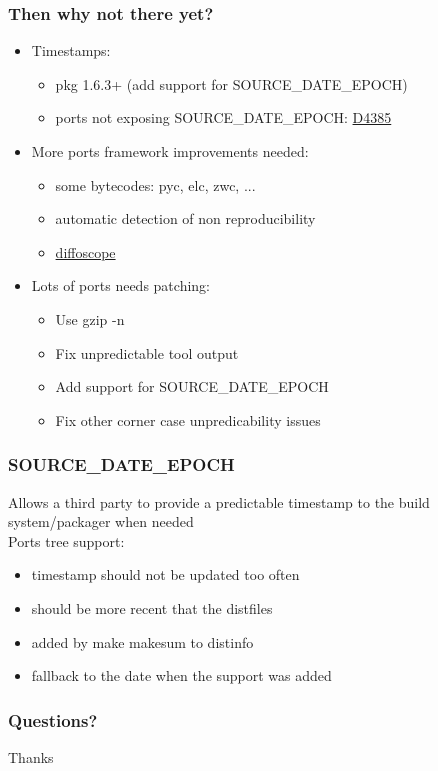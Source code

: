 \begin{frame}
	\frametitle{Then why not there yet?}
	\begin{itemize}
		\pause
		\item Timestamps:
			\begin{itemize}
				\item pkg 1.6.3+ (add support for SOURCE\_DATE\_EPOCH)
				\item ports not exposing SOURCE\_DATE\_EPOCH: \href{https://reviews.freebsd.org/D4385}{D4385}
			\end{itemize}
		\pause
		\item More ports framework improvements needed:
			\begin{itemize}
				\item some bytecodes: pyc, elc, zwc, ...
				\item automatic detection of non reproducibility
				\item \href{https://diffoscope.org/}{diffoscope}
			\end{itemize}
		\pause
		\item Lots of ports needs patching:
			\begin{itemize}
				\item Use gzip -n
				\item Fix unpredictable tool output
				\item Add support for SOURCE\_DATE\_EPOCH
				\item Fix other corner case unpredicability issues
			\end{itemize}
	\end{itemize}
\end{frame}

\begin{frame}
	\frametitle{SOURCE\_DATE\_EPOCH}
	Allows a third party to provide a predictable timestamp to the build system/packager when needed \\
	Ports tree support:
	\begin{itemize}
		\item timestamp should not be updated too often
		\item should be more recent that the distfiles
		\item added by make makesum to distinfo
		\item fallback to the date when the support was added
	\end{itemize}
\end{frame}

\begin{frame}
	\frametitle{Questions?}
	\center
	\huge Thanks
\end{frame}


